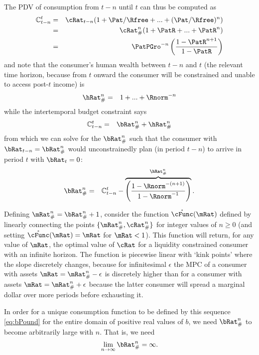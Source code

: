 \documentclass[../BufferStockTheory.tex]{subfiles}
\begin{document}
The PDV of consumption from $t-n$ until $t$ can thus be computed as
\begin{eqnarray}
   \mathbb{C}_{t-n}^{t} & = & \cRat_{t-n}(1+\Pat/\Rfree+ ... + (\Pat/\Rfree)^{n}) \notag
\\ & = & \cRat_{\#}^{n}(1+\PatR+ ... + \PatR^{n}) \notag
\\ & = & \PatPGro^{-n}\left(\frac{1-\PatR^{n+1}}{1-\PatR}\right) \label{PDVc}
\end{eqnarray}
and note that the consumer's human wealth between $t-n$ and $t$ (the relevant
time horizon, because from $t$ onward the consumer will be constrained
and unable to access post-$t$ income) is
\begin{eqnarray}
  \hRat_{\#}^{n} & = & 1+...+\Rnorm^{-n}
\end{eqnarray}
while the intertemporal budget constraint says
\begin{eqnarray*}
  \mathbb{C}_{t-n}^{t} & = & \bRat_{\#}^{n}+\hRat_{\#}^{n}
\end{eqnarray*}
from which we can solve for the $\bRat_{\#}^{n}$ such that
the consumer with $\bRat_{t-n} = \bRat_{\#}^{n}$ would
unconstrainedly plan (in period $t-n$) to arrive in period $t$ with
$\bRat_{t}=0$:
\begin{eqnarray}
\bRat_{\#}^{n} & =&  \mathbb{C}_{t-n}^{t} - \overbrace{\left(\frac{1-\Rnorm^{-(n+1)}}{1-\Rnorm^{-1}}\right)}^{\hRat_{\#}^{n}} \label{eq:bPound}.
\end{eqnarray}

Defining $\mRat_{\#}^{n}=\bRat_{\#}^{n}+1$, consider the function
$\mathring{\cFunc}(\mRat)$ defined by linearly connecting the points
$\{\mRat_{\#}^{n},\cRat_{\#}^{n}\}$ for integer values of $n \geq 0$
(and setting $\mathring{\cFunc}(\mRat)=\mRat$ for $\mRat<1$).  This
function will return, for any value of $\mRat$, the optimal value of
$\cRat$ for a liquidity constrained consumer with an infinite horizon.
The function is piecewise linear with `kink points' where the slope
discretely changes, because for infinitesimal $\epsilon$ the MPC of a
consumer with assets $\mRat=\mRat_{\#}^{n}-\epsilon$ is discretely
higher than for a consumer with assets $\mRat=\mRat_{\#}^{n}+\epsilon$
because the latter consumer will spread a marginal dollar over more
periods before exhausting it.

In order for a unique consumption function to be defined by this
sequence \eqref{eq:bPound} for the entire domain of positive real
values of $b$, we need $\bRat_{\#}^{n}$ to become arbitrarily large with
$n$.  That is, we need
\begin{eqnarray}
  \lim_{n \rightarrow \infty} \bRat_{\#}^{n} = \infty. \label{eq:bToInfty}
\end{eqnarray}
\end{document}

